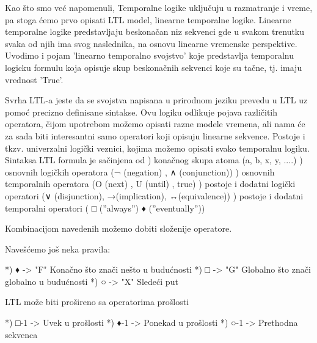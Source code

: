 \documentclass[a4paper]{article}
\begin{document}
{	\newline
	Kao što smo već napomenuli, Temporalne logike uključuju u razmatranje i vreme, pa stoga ćemo prvo opisati LTL model, linearne temporalne logike. Linearne temporalne logike predstavljaju beskonačan niz sekvenci gde u svakom trenutku svaka od njih ima svog naslednika, na osnovu linearne vremenske perspektive. Uvodimo i pojam 'linearno temporalno svojstvo' koje predstavlja temporalnu logicku formulu koja opisuje skup beskonačnih sekvenci koje su tačne, tj. imaju vrednost 'True'. 

	Svrha LTL-a jeste da se svojstva napisana u prirodnom jeziku prevedu u LTL uz pomoć precizno definisane sintakse. Ovu logiku odlikuje pojava različitih operatora, čijom upotrebom možemo opisati razne modele vremena, ali nama će za sada biti interesantni samo operatori koji opisuju linearne sekvence. Postoje i tkzv. univerzalni logički veznici, kojima možemo opisati svako temporalnu logiku.\newline
	\newline
	Sintaksa
	\newline
	\newline
	LTL formula je sačinjena od ) konačnog skupa atoma (a, b, x, y, ....) ) osnovnih logičkih operatora (¬ (negation) , ∧ (conjunction)) ) osnovnih temporalnih operatora (O (next) , U (until) , true) ) postoje i dodatni logički operatori (∨ (disjunction), →(implication), ↔(equivalence)) ) postoje i dodatni temporalni operatori ( □ (”always”) ♦ (”eventually”)) \newline

	Kombinacijom navedenih možemo dobiti složenije operatore.

	Navešćemo još neka pravila: \newline

		*) ♦ -> "F" Konačno što znači nešto u budućnosti \newline
		*) □ -> "G" Globalno što znači globalno u budućnosti \newline
		*) ○ -> "X" Sledeći put \newline

	LTL može biti prošireno sa operatorima prošlosti \newline
		
		*) □-1 -> Uvek u prošlosti \newline
		*) ♦-1 -> Ponekad u prošlosti \newline
		*) ○-1 -> Prethodna sekvenca \newline

}
\end{document}
